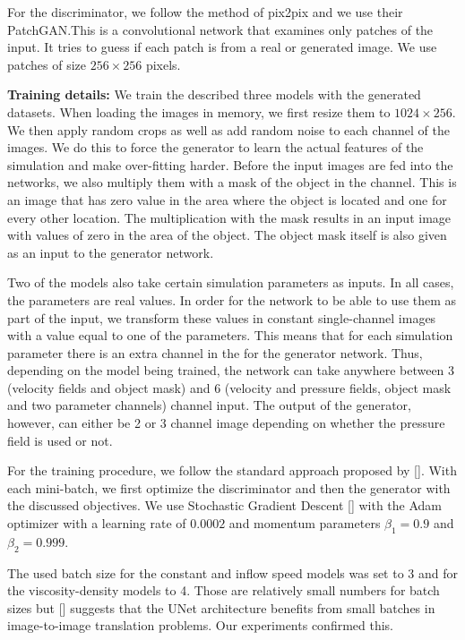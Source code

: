 \documentclass{llncs}
\begin{document}
For the discriminator, we follow the method of pix2pix and we use their PatchGAN.\@ This is a convolutional network that examines only patches of the input. It tries to guess if each patch is from a real or generated image. We use patches of size $256\times 256$ pixels.

\noindent\textbf{Training details:} We train the described three models with the generated datasets. When loading the images in memory, we first resize them to $1024\times 256$. We then apply random crops as well as add random noise to each channel of the images. We do this to force the generator to learn the actual features of the simulation and make over-fitting harder. Before the input images are fed into the networks, we also multiply them with a mask of the object in the channel. This is an image that has zero value in the area where the object is located and one for every other location. The multiplication with the mask results in an input image with values of zero in the area of the object. The object mask itself is also given as an input to the generator network.

Two of the models also take certain simulation parameters as inputs. In all cases, the parameters are real values. In order for the network to be able to use them as part of the input, we transform these values in constant single-channel images with a value equal to one of the parameters. This means that for each simulation parameter there is an extra channel in the for the generator network. Thus, depending on the model being trained, the network can take anywhere between 3 (velocity fields and object mask) and 6 (velocity and pressure fields, object mask and two parameter channels) channel input. The output of the generator, however, can either be 2 or 3 channel image depending on whether the pressure field is used or not.

For the training procedure, we follow the standard approach proposed by []. With each mini-batch, we first optimize the discriminator and then the generator with the discussed objectives. We use Stochastic Gradient Descent [] with the Adam optimizer with a learning rate of $0.0002$ and momentum parameters $\beta_1=0.9$ and $\beta_2=0.999$.

The used batch size for the constant and inflow speed models was set to 3 and for the viscosity-density models to 4. Those are relatively small numbers for batch sizes but [] suggests that the UNet architecture benefits from small batches in image-to-image translation problems. Our experiments confirmed this.
\end{document}
